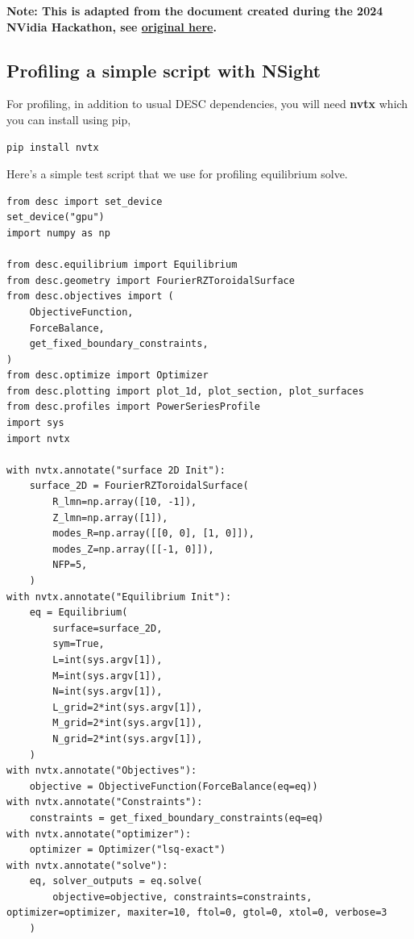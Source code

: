 \textbf{Note: This is adapted from the document created during the 2024 NVidia Hackathon, see \href{https://docs.google.com/document/d/1x6nGZEiZnAiWBDf20Mcbwbob9a6GMbx3ZpT_huUVZF4/edit?usp=sharing}{original here}.
}
\subsection{Profiling a simple script with NSight}

For profiling, in addition to usual DESC dependencies, you will need \textbf{nvtx} which you can install using pip,

\begin{verbatim}
pip install nvtx
\end{verbatim}

Here’s a simple test script that we use for profiling equilibrium solve.

\begin{verbatim}
from desc import set_device
set_device("gpu")
import numpy as np

from desc.equilibrium import Equilibrium
from desc.geometry import FourierRZToroidalSurface
from desc.objectives import (
    ObjectiveFunction,
    ForceBalance,
    get_fixed_boundary_constraints,
)
from desc.optimize import Optimizer
from desc.plotting import plot_1d, plot_section, plot_surfaces
from desc.profiles import PowerSeriesProfile
import sys
import nvtx

with nvtx.annotate("surface 2D Init"):
    surface_2D = FourierRZToroidalSurface(
        R_lmn=np.array([10, -1]),                                                    
        Z_lmn=np.array([1]),
        modes_R=np.array([[0, 0], [1, 0]]),                                                                 
        modes_Z=np.array([[-1, 0]]),
        NFP=5,                                                                             
    )                       
with nvtx.annotate("Equilibrium Init"):
    eq = Equilibrium(
        surface=surface_2D,
        sym=True,
        L=int(sys.argv[1]),
        M=int(sys.argv[1]),
        N=int(sys.argv[1]),
        L_grid=2*int(sys.argv[1]),
        M_grid=2*int(sys.argv[1]),
        N_grid=2*int(sys.argv[1]),
    )
with nvtx.annotate("Objectives"):
    objective = ObjectiveFunction(ForceBalance(eq=eq))
with nvtx.annotate("Constraints"):
    constraints = get_fixed_boundary_constraints(eq=eq)
with nvtx.annotate("optimizer"):
    optimizer = Optimizer("lsq-exact")
with nvtx.annotate("solve"):
    eq, solver_outputs = eq.solve(
        objective=objective, constraints=constraints, optimizer=optimizer, maxiter=10, ftol=0, gtol=0, xtol=0, verbose=3
    )
\end{verbatim}

